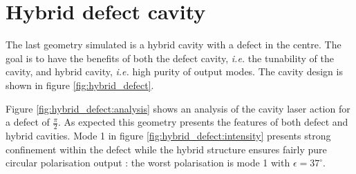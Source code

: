\clearpage
\section{Hybrid defect cavity}

The last geometry simulated is a hybrid cavity with a defect in the centre. The goal is to have the benefits of both the defect cavity, \textit{i.e.} the tunability of the cavity, and hybrid cavity, \textit{i.e.} high purity of output modes. The cavity design is shown in figure \ref{fig:hybrid_defect}.

Figure \ref{fig:hybrid_defect:analysis} shows an analysis of the cavity laser action for a defect of $\frac{\pi}{2}$. As expected this geometry presents the features of both defect and hybrid cavities. Mode 1 in figure \ref{fig:hybrid_defect:intensity} presents strong confinement within the defect while the hybrid structure ensures fairly pure circular polarisation output : the worst polarisation is mode 1 with $\epsilon=37^\circ$.

